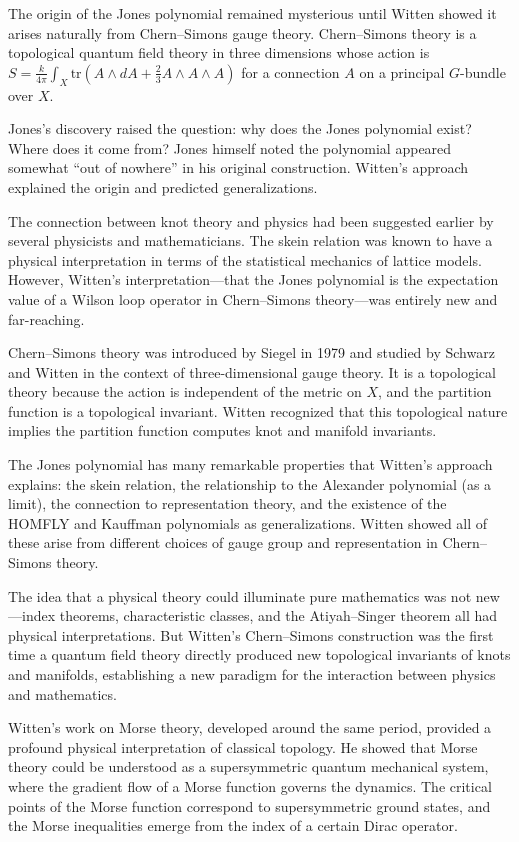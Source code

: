 The origin of the Jones polynomial remained mysterious until Witten showed \cite{witten1989} it arises naturally from Chern--Simons gauge theory. Chern--Simons theory is a topological quantum field theory in three dimensions whose action is $S = \frac{k}{4\pi}\int_X \text{tr}(A \wedge dA + \frac{2}{3}A \wedge A \wedge A)$ for a connection $A$ on a principal $G$-bundle over $X$.

Jones's discovery raised the question: why does the Jones polynomial exist? Where does it come from? Jones himself noted the polynomial appeared somewhat ``out of nowhere'' in his original construction. Witten's approach explained the origin and predicted generalizations.

The connection between knot theory and physics had been suggested earlier by several physicists and mathematicians. The skein relation was known to have a physical interpretation in terms of the statistical mechanics of lattice models. However, Witten's interpretation---that the Jones polynomial is the expectation value of a Wilson loop operator in Chern--Simons theory---was entirely new and far-reaching.

Chern--Simons theory was introduced by Siegel in 1979 and studied by Schwarz and Witten in the context of three-dimensional gauge theory. It is a topological theory because the action is independent of the metric on $X$, and the partition function is a topological invariant. Witten recognized that this topological nature implies the partition function computes knot and manifold invariants.

The Jones polynomial has many remarkable properties that Witten's approach explains: the skein relation, the relationship to the Alexander polynomial (as a limit), the connection to representation theory, and the existence of the HOMFLY and Kauffman polynomials as generalizations. Witten showed all of these arise from different choices of gauge group and representation in Chern--Simons theory.

The idea that a physical theory could illuminate pure mathematics was not new---index theorems, characteristic classes, and the Atiyah--Singer theorem all had physical interpretations. But Witten's Chern--Simons construction was the first time a quantum field theory directly produced new topological invariants of knots and manifolds, establishing a new paradigm for the interaction between physics and mathematics.

Witten's work on Morse theory, developed around the same period, provided a profound physical interpretation of classical topology. He showed that Morse theory could be understood as a supersymmetric quantum mechanical system, where the gradient flow of a Morse function governs the dynamics. The critical points of the Morse function correspond to supersymmetric ground states, and the Morse inequalities emerge from the index of a certain Dirac operator.

